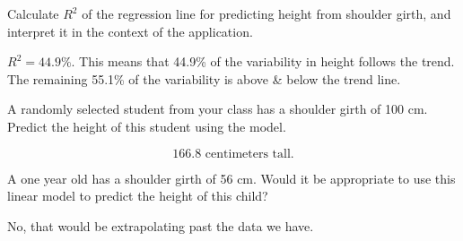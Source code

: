 \documentclass[12pt,answers]{exam}
\begin{document}
\begin{questions}
\begin{parts}
\item Calculate $R^2$ of the regression line for predicting height from shoulder girth, and interpret it in the context of the application.
\begin{solution}
$R^2 = 44.9\%$.  This means that 44.9\% of the variability in height follows the trend.  The remaining 55.1\% of the variability is above \& below the trend line.
\end{solution}
\bigskip

\item A randomly selected student from your class has a shoulder girth of 100 cm. Predict the height of this student using the model.
\begin{solution}
$$166.8 \text{ centimeters tall.}$$
\end{solution}
\bigskip

\item A one year old has a shoulder girth of 56 cm. Would it be appropriate to use this linear model to predict the height of this child?
\begin{solution}
No, that would be extrapolating past the data we have. 
\end{solution}
\bigskip

\end{parts}

\end{questions}
\end{document}
